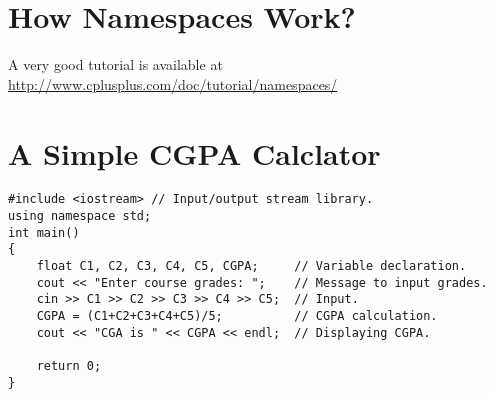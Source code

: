 \documentclass[12pt,a4paper]{article}
\begin{document}
\section{How Namespaces Work?}
A very good tutorial is available at \url{http://www.cplusplus.com/doc/tutorial/namespaces/}
\section{A Simple CGPA Calclator}
\begin{lstlisting}[caption={CGPA Calculator}]
#include <iostream> // Input/output stream library.
using namespace std;
int main()
{
	float C1, C2, C3, C4, C5, CGPA;		// Variable declaration.
	cout << "Enter course grades: ";	// Message to input grades.
	cin >> C1 >> C2 >> C3 >> C4 >> C5;	// Input.
	CGPA = (C1+C2+C3+C4+C5)/5;			// CGPA calculation.
	cout << "CGA is " << CGPA << endl;	// Displaying CGPA.
	
	return 0;
}
\end{lstlisting}
\end{document}

